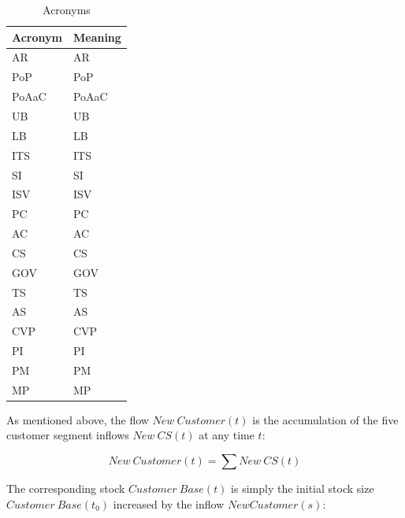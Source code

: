 \begin{table}[t]
	\centering
	\begin{tabular}{ll}
			\toprule 
			\footnotesize \textbf{Acronym} & \footnotesize \textbf{Meaning}	 \\ \midrule
			\footnotesize \acs{AR} & \footnotesize \acl{AR} \\ 
			\footnotesize \acs{PoP} & \footnotesize \acl{PoP}\\ 
			\footnotesize \acs{PoAaC} & \footnotesize \acl{PoAaC}\\ 
			\footnotesize \acs{UB} & \footnotesize \acl{UB} \\
			\footnotesize \acs{LB} & \footnotesize \acl{LB}\\ \midrule
			\footnotesize \acs{ITS} & \footnotesize \acl{ITS}\\
			\footnotesize \acs{SI} & \footnotesize \acl{SI}\\
			\footnotesize \acs{ISV} & \footnotesize \acl{ISV}\\
			\footnotesize \acs{PC} & \footnotesize \acl{PC}\\
			\footnotesize \acs{AC} & \footnotesize \acl{AC}\\ 
			\footnotesize \acs{CS} & \footnotesize \acl{CS}\\ \midrule
			\footnotesize \acs{GOV} & \footnotesize \acl{GOV}\\
			\footnotesize \acs{TS} & \footnotesize \acl{TS}\\
			\footnotesize \acs{AS} & \footnotesize \acl{AS}\\
			\footnotesize \acs{CVP} & \footnotesize \acl{CVP}\\ \midrule
			\footnotesize \acs{PI} & \footnotesize \acl{PI}\\
			\footnotesize \acs{PM} & \footnotesize \acl{PM}\\
			\footnotesize \acs{MP} & \footnotesize \acl{MP}\\ \bottomrule
	\end{tabular}
	\caption{Acronyms}
	\label{tab:acro}
\end{table}

As mentioned above, the flow $New~Customer(t)$ is the accumulation of the five customer segment inflows $New~CS(t)$ at any time $t$:

\begin{equation}\label{eq:nc}
	\mathit{New~Customer(t)} = \sum{\mathit{New~CS(t)}}
\end{equation}

The corresponding stock $Customer~Base(t)$ is simply the initial stock size $\mathit{Customer~Base(t_0)}$ increased by the inflow $New Customer(s)$:

